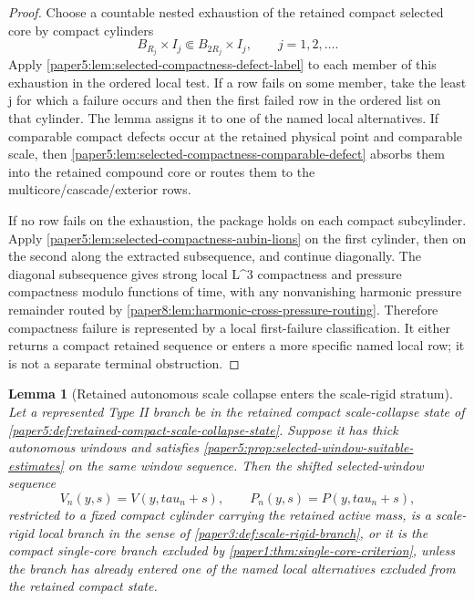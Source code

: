 \documentclass[11pt]{amsart}
\def\({}%
\def\){}%
\def\tau{tau}%
\theoremstyle{plain}
\newtheorem{lemma}[lemma]{Lemma}
\theoremstyle{definition}
\theoremstyle{remark}
\begin{document}
\begin{proof}
Choose a countable nested exhaustion of the retained compact selected core by
compact cylinders
\[
  B_{R_j}\times I_j\Subset B_{2R_j}\times I_j,
  \qquad j=1,2,\dots .
\]
Apply \cref{paper5:lem:selected-compactness-defect-label} to each member of
this exhaustion in the ordered local test.  If a row fails on some member, take
the least \(j\) for which a failure occurs and then the first failed row in the
ordered list on that cylinder.  The lemma assigns it to one of the named local
alternatives.  If comparable compact defects occur at the retained physical
point and comparable scale, then
\cref{paper5:lem:selected-compactness-comparable-defect} absorbs them into the
retained compound core or routes them to the multicore/cascade/exterior rows.

If no row fails on the exhaustion, the package holds on each compact
subcylinder.  Apply
\cref{paper5:lem:selected-compactness-aubin-lions} on the first cylinder, then
on the second along the extracted subsequence, and continue diagonally.  The
diagonal subsequence gives strong local \(L^3\)
compactness and pressure compactness modulo functions of time, with any
nonvanishing harmonic pressure remainder routed by
\cref{paper8:lem:harmonic-cross-pressure-routing}.  Therefore compactness
failure is represented by a local first-failure
classification.  It either returns a compact retained sequence or enters a
more specific named local row; it is not a separate terminal obstruction.
\end{proof}

\begin{lemma}[Retained autonomous scale collapse enters the scale-rigid stratum]
\label{paper5:lem:autonomous-scale-collapse-is-scale-rigid}
Let a represented Type II branch be in the retained compact scale-collapse
state of \cref{paper5:def:retained-compact-scale-collapse-state}.  Suppose it
has thick autonomous windows and satisfies
\cref{paper5:prop:selected-window-suitable-estimates} on the same window sequence.  Then
the shifted selected-window sequence
\[
  V_n(y,s)=V(y,\tau_n+s),\qquad
  P_n(y,s)=P(y,\tau_n+s),
\]
restricted to a fixed compact cylinder carrying the retained active mass, is a
scale-rigid local branch in the sense of
\cref{paper3:def:scale-rigid-branch}, or it is the compact single-core branch
excluded by \cref{paper1:thm:single-core-criterion}, unless the branch has
already entered one of the named local alternatives excluded from the retained
compact state.
\end{lemma}
\end{document}
